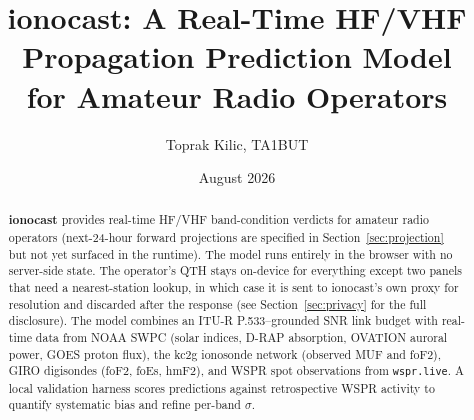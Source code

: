 \documentclass[11pt,a4paper]{article}
\title{\textbf{ionocast}: A Real-Time HF/VHF Propagation Prediction Model\\
       for Amateur Radio Operators}
\author{Toprak Kilic, TA1BUT}
\date{August 2026}
\begin{document}
\maketitle
\thispagestyle{fancy}

\begin{abstract}
\noindent
\textbf{ionocast} provides real-time HF/VHF band-condition verdicts
for amateur radio operators (next-24-hour forward projections are
specified in Section~\ref{sec:projection} but not yet surfaced in
the runtime).  The model
runs entirely in the browser with no server-side state.  The operator's
QTH stays on-device for everything except two panels that need a
nearest-station lookup, in which case it is sent to ionocast's own
proxy for resolution and discarded after the response (see
Section~\ref{sec:privacy} for the full disclosure).  The model
combines an ITU-R P.533--grounded SNR
link budget with real-time data from NOAA SWPC (solar indices, D-RAP
absorption, OVATION auroral power, GOES proton flux), the kc2g
ionosonde network (observed MUF and foF2), GIRO digisondes (foF2,
foEs, hmF2), and WSPR spot observations from \texttt{wspr.live}.
A local validation harness scores predictions against retrospective
WSPR activity to quantify systematic bias and refine per-band
$\sigma$.


\end{abstract}
\end{document}

